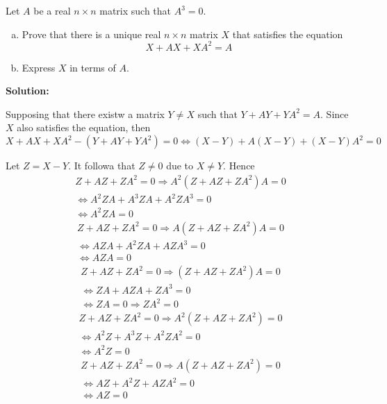 \documentclass[../../main.tex]{subfiles}
\begin{document}
  \begin{shaded}
    Let $A$ be a real $n \times n$ matrix such that $A^3 = 0$.

    \begin{enumerate}[(a)]
      \item Prove that there is a unique real $n \times n$ matrix $X$ that satisfies the equation
      $$
      X + A X + X A^2 = A
      $$
      \item Express $X$ in terms of $A$.
    \end{enumerate}
  \end{shaded}

  \textbf{Solution:}

  Supposing that there existw a matrix $Y \ne X$ such that $Y + A Y + Y A^2 = A$. Since $X$ also satisfies the equation, then
  $$
  X + A X + X A^2 - (Y + A Y + Y A^2) = 0 \iff (X - Y) + A (X - Y) + (X - Y) A^2 = 0
  $$

  Let $Z = X - Y$. It followa that $Z \ne 0$ due to $X \ne Y$. Hence
  \begin{equation*}
    \begin{split}
      Z + A Z + Z A^2 = 0 \Longrightarrow
      A^2 (Z + A Z + Z A^2) A = 0 \\ \iff
      A^2 Z A + A^3 Z A + A^2 Z A^3 = 0 \\ \iff
      A^2 Z A = 0
    \end{split}
  \end{equation*}
  \begin{equation*}
    \begin{split}
      Z + A Z + Z A^2 = 0 \Longrightarrow
      A (Z + A Z + Z A^2) A = 0 \\ \iff
      A Z A + A^2 Z A + A Z A^3 = 0 \\ \iff
      A Z A = 0
    \end{split}
  \end{equation*}
  \begin{equation*}
    \begin{split}
      Z + A Z + Z A^2 = 0 \Longrightarrow
      (Z + A Z + Z A^2) A = 0 \\ \iff
      Z A + A Z A + Z A^3 = 0 \\ \iff
      Z A = 0 \Longrightarrow Z A^2 = 0
    \end{split}
  \end{equation*}
  \begin{equation*}
    \begin{split}
      Z + A Z + Z A^2 = 0 \Longrightarrow
      A^2 (Z + A Z + Z A^2) = 0 \\ \iff
      A^2 Z + A^3 Z + A^2 Z A^2 = 0 \\ \iff
      A^2 Z = 0
    \end{split}
  \end{equation*}
  \begin{equation*}
    \begin{split}
      Z + A Z + Z A^2 = 0 \Longrightarrow
      A (Z + A Z + Z A^2) = 0 \\ \iff
      A Z + A^2 Z + A Z A^2 = 0 \\ \iff
      A Z = 0
    \end{split}
  \end{equation*}
\end{document}
